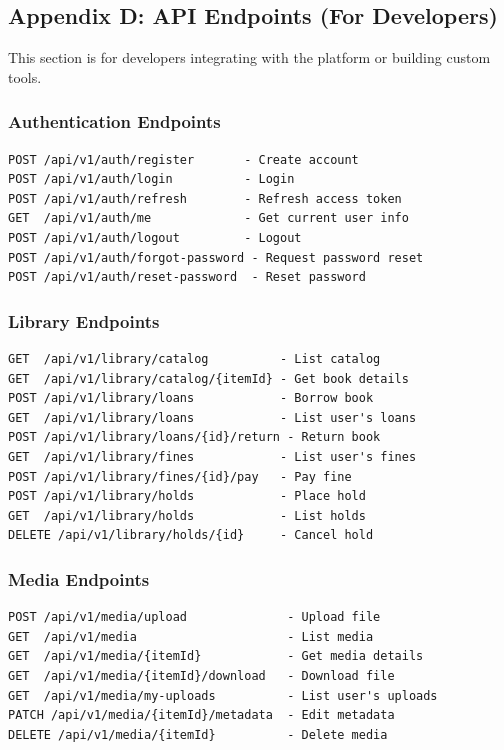 \documentclass[12pt,a4paper]{article}
\begin{document}
\newpage

\subsection{Appendix D: API Endpoints (For Developers)}

\begin{tcolorbox}[colback=yellow!10!white,colframe=orange,title=For Technical Users]
This section is for developers integrating with the platform or building custom tools.
\end{tcolorbox}

\subsubsection{Authentication Endpoints}
\begin{verbatim}
POST /api/v1/auth/register       - Create account
POST /api/v1/auth/login          - Login
POST /api/v1/auth/refresh        - Refresh access token
GET  /api/v1/auth/me             - Get current user info
POST /api/v1/auth/logout         - Logout
POST /api/v1/auth/forgot-password - Request password reset
POST /api/v1/auth/reset-password  - Reset password
\end{verbatim}

\subsubsection{Library Endpoints}
\begin{verbatim}
GET  /api/v1/library/catalog          - List catalog
GET  /api/v1/library/catalog/{itemId} - Get book details
POST /api/v1/library/loans            - Borrow book
GET  /api/v1/library/loans            - List user's loans
POST /api/v1/library/loans/{id}/return - Return book
GET  /api/v1/library/fines            - List user's fines
POST /api/v1/library/fines/{id}/pay   - Pay fine
POST /api/v1/library/holds            - Place hold
GET  /api/v1/library/holds            - List holds
DELETE /api/v1/library/holds/{id}     - Cancel hold
\end{verbatim}

\subsubsection{Media Endpoints}
\begin{verbatim}
POST /api/v1/media/upload              - Upload file
GET  /api/v1/media                     - List media
GET  /api/v1/media/{itemId}            - Get media details
GET  /api/v1/media/{itemId}/download   - Download file
GET  /api/v1/media/my-uploads          - List user's uploads
PATCH /api/v1/media/{itemId}/metadata  - Edit metadata
DELETE /api/v1/media/{itemId}          - Delete media
\end{verbatim}
\end{document}

